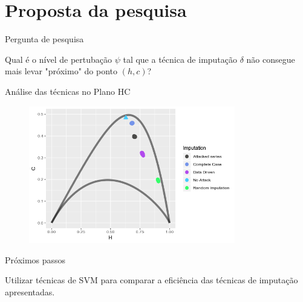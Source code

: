 \documentclass{beamer} %
\begin{document}
\section{Proposta da pesquisa}

\begin{frame}{Pergunta de pesquisa}

Qual é o nível de pertubação $\psi$ tal que a técnica de imputação $\delta$ não consegue mais levar "próximo" do ponto $(h,c)$?

\end{frame}

\begin{frame}{Análise das técnicas no Plano HC}
    \begin{figure}
      \centering
       \includegraphics[width=9cm,height=6cm]{hcplane.png}
    \end{figure}
\end{frame}

\begin{frame}{Próximos passos}

Utilizar técnicas de SVM para comparar a eficiência das técnicas de imputação apresentadas.

\end{frame}
\end{document}
